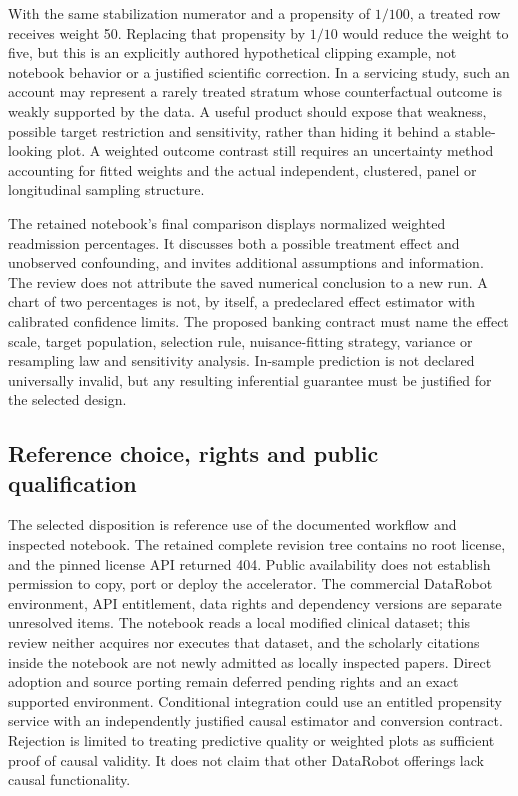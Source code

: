 With the same stabilization numerator and a propensity of $1/100$, a treated
row receives weight 50. Replacing that propensity by $1/10$ would reduce the
weight to five, but this is an explicitly authored hypothetical clipping
example, not notebook behavior or a justified scientific correction. In a
servicing study, such an account may represent a rarely treated stratum whose
counterfactual outcome is weakly supported by the data. A useful product
should expose that weakness, possible target restriction and sensitivity,
rather than hiding it behind a stable-looking plot. A weighted outcome contrast
still requires an uncertainty method accounting for fitted weights and the
actual independent, clustered, panel or longitudinal sampling structure.
\citep{exec25_datarobot_choice}

The retained notebook's final comparison displays normalized weighted
readmission percentages. It discusses both a possible treatment effect and
unobserved confounding, and invites additional assumptions and information.
The review does not attribute the saved numerical conclusion to a new run.
A chart of two percentages is not, by itself, a predeclared effect estimator
with calibrated confidence limits. The proposed banking contract must name
the effect scale, target population, selection rule, nuisance-fitting strategy,
variance or resampling law and sensitivity analysis. In-sample prediction is
not declared universally invalid, but any resulting inferential guarantee must
be justified for the selected design.~\citep{exec25_datarobot_notebook,exec25_datarobot_choice}

\subsection{Reference choice, rights and public qualification}
The selected disposition is reference use of the documented workflow and
inspected notebook. The retained complete revision tree contains no root
license, and the pinned license API returned 404. Public availability does
not establish permission to copy, port or deploy the accelerator. The
commercial DataRobot environment, API entitlement, data rights and dependency
versions are separate unresolved items. The notebook reads a local modified
clinical dataset; this review neither acquires nor executes that dataset, and
the scholarly citations inside the notebook are not newly admitted as locally
inspected papers. Direct adoption and source porting remain deferred pending
rights and an exact supported environment. Conditional integration could use
an entitled propensity service with an independently justified causal
estimator and conversion contract. Rejection is limited to treating predictive
quality or weighted plots as sufficient proof of causal validity. It does not
claim that other DataRobot offerings lack causal functionality.
\citep{exec13_ch_datarobot,exec25_datarobot_notebook,exec25_datarobot_choice}

